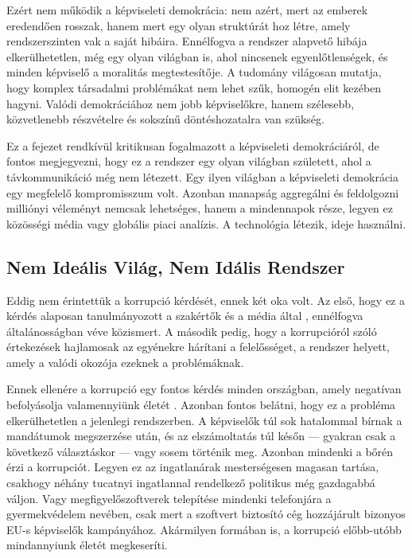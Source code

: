 Ezért nem működik a képviseleti demokrácia: nem azért, mert az emberek eredendően
rosszak, hanem mert egy olyan struktúrát hoz létre, amely rendszerszinten vak a saját
hibáira. Ennélfogva a rendszer alapvető hibája elkerülhetetlen, még egy olyan világban
is, ahol nincsenek egyenlőtlenségek, és minden képviselő a moralitás megtestesítője. A
tudomány világosan mutatja, hogy komplex társadalmi problémákat nem lehet szűk, homogén
elit kezében hagyni. Valódi demokráciához nem jobb képviselőkre, hanem szélesebb,
közvetlenebb részvételre és sokszínű döntéshozatalra van szükség.

Ez a fejezet rendkívül kritikusan fogalmazott a képviseleti demokráciáról, de fontos
megjegyezni, hogy ez a rendszer egy olyan világban született, ahol a távkommunikáció még
nem létezett. Egy ilyen világban a képviseleti demokrácia egy megfelelő kompromisszum
volt. Azonban manapság aggregálni és feldolgozni milliónyi véleményt nemcsak lehetséges,
hanem a mindennapok része, legyen ez közösségi média vagy globális piaci analízis. A
technológia létezik, ideje használni.


\subsection{Nem Ideális Világ, Nem Idális Rendszer}

Eddig nem érintettük a korrupció kérdését, ennek két oka volt. Az első, hogy ez
a kérdés alaposan tanulmányozott a szakértők és a média által \cite{corruption},
ennélfogva általánosságban véve közismert. A második pedig, hogy a korrupcióról szóló
értekezések hajlamosak az egyénekre hárítani a felelősséget, a rendszer helyett, amely
a valódi okozója ezeknek a problémáknak.

Ennek ellenére a korrupció egy fontos kérdés minden országban, amely negatívan
befolyásolja valamennyiünk életét \cite{corruption_and_inequality}.  Azonban fontos
belátni, hogy ez a probléma elkerülhetetlen a jelenlegi rendszerben. A képviselők túl
sok hatalommal bírnak a mandátumok megszerzése után, és az elszámoltatás túl későn
--- gyakran csak a következő választáskor --- vagy sosem történik meg. Azonban mindenki
a bőrén érzi a korrupciót. Legyen ez az ingatlanárak mesterségesen magasan tartása,
csakhogy néhány tucatnyi ingatlannal rendelkező politikus még gazdagabbá váljon. Vagy
megfigyelőszoftverek telepítése mindenki telefonjára a gyermekvédelem nevében, csak mert
a szoftvert biztosító cég hozzájárult bizonyos EU-s képviselők kampányához. Akármilyen
formában is, a korrupció előbb-utóbb mindannyiunk életét megkeseríti.

